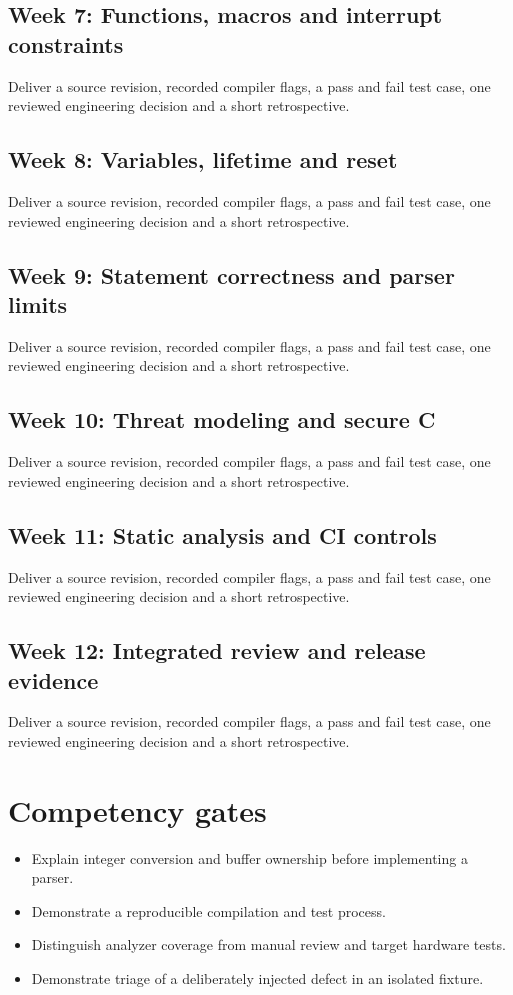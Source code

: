 \documentclass[10pt,letterpaper]{article}
\begin{document}
\subsection*{Week 7: Functions, macros and interrupt constraints}
Deliver a source revision, recorded compiler flags, a pass and fail test case, one reviewed engineering decision and a short retrospective.

\subsection*{Week 8: Variables, lifetime and reset}
Deliver a source revision, recorded compiler flags, a pass and fail test case, one reviewed engineering decision and a short retrospective.

\subsection*{Week 9: Statement correctness and parser limits}
Deliver a source revision, recorded compiler flags, a pass and fail test case, one reviewed engineering decision and a short retrospective.

\subsection*{Week 10: Threat modeling and secure C}
Deliver a source revision, recorded compiler flags, a pass and fail test case, one reviewed engineering decision and a short retrospective.

\subsection*{Week 11: Static analysis and CI controls}
Deliver a source revision, recorded compiler flags, a pass and fail test case, one reviewed engineering decision and a short retrospective.

\subsection*{Week 12: Integrated review and release evidence}
Deliver a source revision, recorded compiler flags, a pass and fail test case, one reviewed engineering decision and a short retrospective.

\section{Competency gates}
\begin{itemize}
\item Explain integer conversion and buffer ownership before implementing a parser.
\item Demonstrate a reproducible compilation and test process.
\item Distinguish analyzer coverage from manual review and target hardware tests.
\item Demonstrate triage of a deliberately injected defect in an isolated fixture.
\end{itemize}
\end{document}
